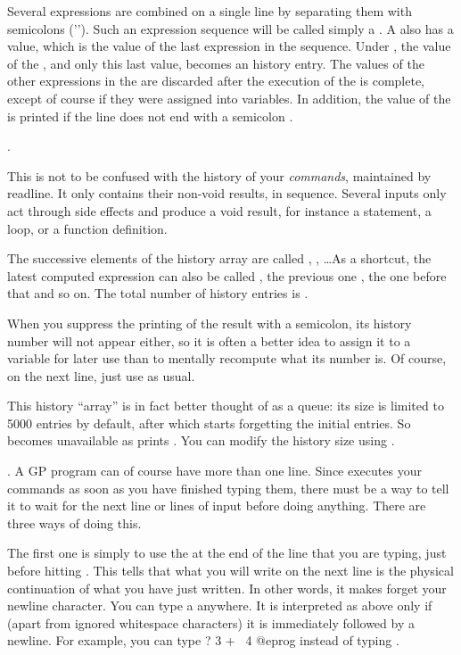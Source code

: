 Several expressions are combined on a single line by separating them with
semicolons ('\kbd{;}'). Such an expression sequence will be called simply a
. A  also has a value, which is the value of the last
expression in the sequence. Under , the value of the , and
only this last value, becomes an history entry. The values of the other
expressions in the  are discarded after the execution of the
 is complete, except of course if they were assigned into variables.
In addition, the value of the  is printed if the line does not end
with a semicolon \kbd{;}.

.

This is not to be confused with the history of your \emph{commands},
maintained by readline. It only contains their non-void results, in sequence.
Several inputs only act through side effects and produce a void result, for
instance a  statement, a  loop, or a function definition.

The successive elements of the history array are called , ,
\dots As a shortcut, the latest computed expression can also be
called \kbd{\%}, the previous one ,
the one before that  and so on. The total number of history entries
is \kbd{\%\#}.

When you suppress the printing of the result with a semicolon, its history
number will not appear either, so it is often a better idea to assign it to a
variable for later use than to mentally recompute what its number is. Of
course, on the next line, just use \kbd{\%} as usual.

This history ``array'' is in fact better thought of as a queue: its size is
limited to 5000 entries by default, after which  starts forgetting
the initial entries. So  becomes unavailable as  prints
. You can modify the history size using .

. A GP program
can of course have more than one line. Since  executes your commands as
soon as you have finished typing them, there must be a way to tell it to
wait for the next line or lines of input before doing anything. There are
three ways of doing this.

The first one is simply to use the  \kbd{\bs} at the
end of the line that you are typing, just before hitting . This
tells  that what you will write on the next line is the physical
continuation of what you have just written. In other words, it makes 
forget your newline character. You can type a \kbd{\bs} anywhere. It is
interpreted as above only if (apart from ignored whitespace characters) it is
immediately followed by a newline. For example, you can type
\bprog
? 3 + \
4
@eprog
\noindent instead of typing .

